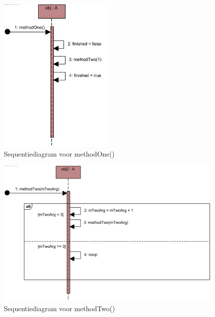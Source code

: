 
\begin{figure}[htp]
	\centering
	\includegraphics[width=0.5\textwidth]{chap-gedrag/methodOne.png}
	\caption{Sequentiediagram voor methodOne()}
	\label{fig:methodOne}
\end{figure}%

\begin{figure}[htp]
	\centering
	\includegraphics[width=\textwidth]{chap-gedrag/methodTwo.png}
	\caption{Sequentiediagram voor methodTwo()}
	\label{fig:methodtwo}
\end{figure}

